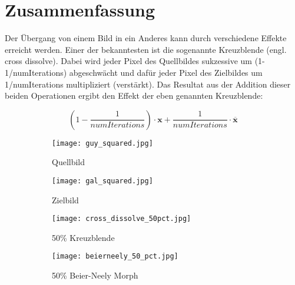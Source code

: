\section*{Zusammenfassung}

Der Übergang von einem Bild in ein Anderes kann durch verschiedene
Effekte erreicht werden. Einer der bekanntesten ist die sogenannte
Kreuzblende (engl. cross dissolve). Dabei wird jeder Pixel des Quellbildes
sukzessive um (1-1/numIterations) abgeschwächt und dafür jeder Pixel
des Zielbildes um 1/numIterations multipliziert (verstärkt). 
Das Resultat aus der Addition dieser beiden Operationen ergibt den
Effekt der eben genannten Kreuzblende:

\begin{equation}	
	\left( 1-\frac{1}{numIterations} \right) \cdot \mathbf{x} + \frac{1}{numIterations} \cdot \overline{\mathbf{x}}
\end{equation}




\begin{figure}
	
	\centering
	\begin{subfigure}{0.4\textwidth}
		\centering
		\texttt{[image: guy\_squared.jpg]}
		\caption{Quellbild}
		\label{fig:source}
	\end{subfigure}
	\hfill
	\begin{subfigure}{0.4\textwidth}
		\centering
		\texttt{[image: gal\_squared.jpg]}
		\caption{Zielbild}
		\label{fig:dest}
	\end{subfigure}
	
	\centering
	\begin{subfigure}{0.4\textwidth}
		\centering
		\texttt{[image: cross\_dissolve\_50pct.jpg]}
		\caption{50\% Kreuzblende}
		\label{fig:dissolve}
	\end{subfigure}
	\hfill
	\begin{subfigure}{0.4\textwidth}
		\centering
		\texttt{[image: beierneely\_50\_pct.jpg]}
		\caption{50\% Beier-Neely Morph}
		\label{fig:morph}
	\end{subfigure}
	\caption{}
	\label{fig:side-by-side}
	
\end{figure}
